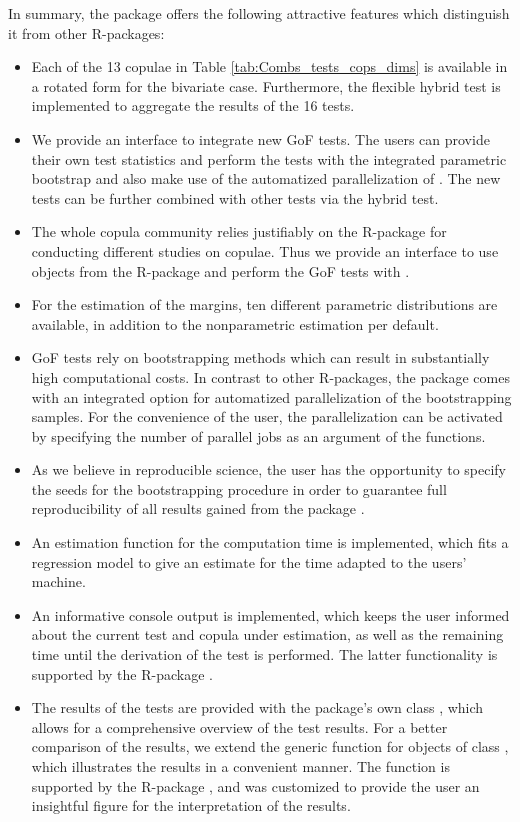 \mycolor In summary, the package  offers the following attractive features which distinguish it from other R-packages:\bk
\begin{itemize}
    \item \mycolor Each of the 13 copulae in Table \ref{tab:Combs_tests_cops_dims} is available in a rotated form for the bivariate case. Furthermore, the flexible hybrid test is implemented to aggregate the results of the 16 tests. \bk
    \item We provide an interface to integrate new GoF tests. The users can provide their own test statistics and perform the tests with the integrated parametric bootstrap and also make use of the automatized parallelization of . The new tests can be further combined with other tests via the hybrid test.
    \item The whole copula community relies justifiably on the R-package  for conducting different studies on copulae. Thus we provide an interface to use objects from the R-package  and perform the GoF tests with .
    \item For the estimation of the margins, ten different parametric distributions are available, in addition to the nonparametric estimation per default.
    \item GoF tests rely on bootstrapping methods which can result in substantially high computational costs. In contrast to other R-packages, the package  comes with an integrated option for automatized parallelization of the bootstrapping samples. For the convenience of the user, the parallelization can be activated by specifying the number of parallel jobs as an argument of the functions.
    \item  As we believe in reproducible science, the user has the opportunity to specify the seeds for the bootstrapping procedure in order to guarantee full reproducibility of all results gained from the package .
    \item An estimation function for the computation time is implemented, which fits a regression model to give an estimate for the time adapted to the users' machine. 
    \item An informative console output is implemented, which keeps the user informed about the current test and copula under estimation, as well as the remaining time until the derivation of the test is performed. The latter functionality is supported by the R-package  \citep{progressPackage}.
    \item The results of the tests are provided with the package's own class , which allows for a comprehensive overview of the test results. For a better comparison of the results, we extend the generic  function for objects of class , which illustrates the results in a convenient manner. The  function is supported by the R-package  \citep{phillips2017yarrr}, and was customized to provide the user an insightful figure for the interpretation of the results.
\end{itemize}


